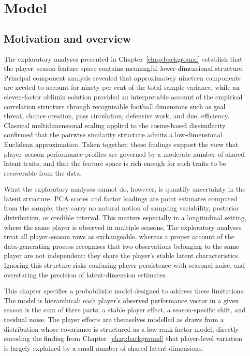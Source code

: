 \chapter{Model}
\label{chap:methodology}

\section{Motivation and overview}

The exploratory analyses presented in Chapter~\ref{chap:background} establish that the player--season feature space contains meaningful lower-dimensional structure. Principal component analysis revealed that approximately nineteen components are needed to account for ninety per cent of the total sample variance, while an eleven-factor oblimin solution provided an interpretable account of the empirical correlation structure through recognisable football dimensions such as goal threat, chance creation, pass circulation, defensive work, and duel efficiency. Classical multidimensional scaling applied to the cosine-based dissimilarity confirmed that the pairwise similarity structure admits a low-dimensional Euclidean approximation. Taken together, these findings support the view that player--season performance profiles are governed by a moderate number of shared latent traits, and that the feature space is rich enough for such traits to be recoverable from the data.

What the exploratory analyses cannot do, however, is quantify uncertainty in the latent structure. PCA scores and factor loadings are point estimates computed from the sample; they carry no natural notion of sampling variability, posterior distribution, or credible interval. This matters especially in a longitudinal setting, where the same player is observed in multiple seasons. The exploratory analyses treat all player--season rows as exchangeable, whereas a proper account of the data-generating process recognises that two observations belonging to the same player are not independent: they share the player's stable latent characteristics. Ignoring this structure risks confusing player persistence with seasonal noise, and overstating the precision of latent-dimension estimates.

This chapter specifies a probabilistic model designed to address these limitations. The model is hierarchical: each player's observed performance vector in a given season is the sum of three parts; a stable player effect, a season-specific shift, and residual noise. The player effects are themselves modelled as draws from a distribution whose covariance is structured as a low-rank factor model, directly encoding the finding from Chapter~\ref{chap:background} that player-level variation is largely explained by a small number of shared latent dimensions.

